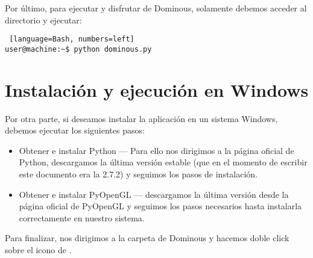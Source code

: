 Por último, para ejecutar y disfrutar de Dominous, solamente debemos acceder al directorio y ejecutar:

\begin{lstlisting} [language=Bash, numbers=left]
user@machine:~$ python dominous.py
\end{lstlisting}

\section{Instalación y ejecución en Windows}

Por otra parte, si deseamos instalar la aplicación en un sistema Windows, debemos ejecutar los siguientes pasos:

\begin{itemize}
    \item Obtener e instalar Python --- Para ello nos dirigimos a la página oficial de Python,
        descargamos la última versión estable (que en el momento de escribir este documento era la 2.7.2) y seguimos los pasos
        de instalación.
    \item Obtener e instalar PyOpenGL --- descargamos la última versión desde la página oficial de
        PyOpenGL y seguimos los pasos necesarios hasta instalarla
        correctamente en nuestro sistema.    
\end{itemize}

Para finalizar, nos dirigimos a la carpeta de Dominous y hacemos doble click sobre el icono de .
